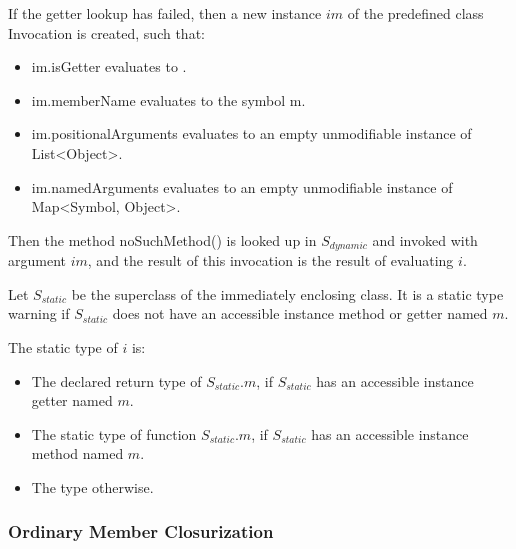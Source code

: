 \documentclass{article}
\newcommand{\code}[1]{{\sf #1}}
\begin{document}
\LMHash{}
If the getter lookup has failed, then a new instance $im$ of the predefined class \code{Invocation} is created, such that:
\begin{itemize}
\item  \code{im.isGetter} evaluates to \code{\TRUE{}}.
\item  \code{im.memberName} evaluates to the symbol \code{m}.
\item \code{im.positionalArguments} evaluates to an empty unmodifiable instance of \code{List<Object>}.
\item \code{im.namedArguments} evaluates to an empty unmodifiable instance of \code{Map<Symbol, Object>}.
\end{itemize}
Then the method \code{noSuchMethod()} is looked up in $S_{dynamic}$ and invoked  with argument $im$, and the result of this invocation is the result of evaluating $i$.

\LMHash{}
Let $S_{static}$ be the superclass of the immediately enclosing class. It is a static type warning if $S_{static}$ does not have an accessible instance method or getter named $m$.

The static type of $i$ is:
\begin{itemize}
\item The declared return type of $S_{static}.m$, if $S_{static}$ has an accessible instance getter named $m$.
\item The static type of function $S_{static}.m$, if $S_{static}$ has an accessible instance method named $m$.
\item The type \DYNAMIC{} otherwise.
\end{itemize}


\subsubsection{Ordinary Member Closurization}
\end{document}

